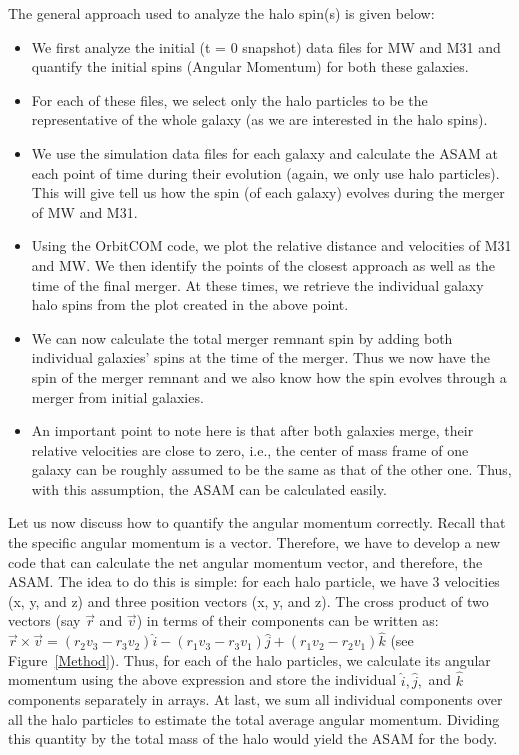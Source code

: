 \documentclass[twocolumn]{aastex631}
\begin{document}
The general approach used to analyze the halo spin(s) is given below:

\begin{itemize}
    \item We first analyze the initial (t = 0 snapshot) data files for MW and M31 and quantify the initial spins (Angular Momentum) for both these galaxies. 

    \item For each of these files, we select only the halo particles to be the representative of the whole galaxy (as we are interested in the halo spins).

    \item We use the simulation data files for each galaxy and calculate the ASAM at each point of time during their evolution (again, we only use halo particles).  This will give tell us how the spin (of each galaxy) evolves during the merger of MW and M31. 

    \item Using the OrbitCOM code, we plot the relative distance and velocities of M31 and MW. We then identify the points of the closest approach as well as the time of the final merger. At these times, we retrieve the individual galaxy halo spins from the plot created in the above point. 

    \item We can now calculate the total merger remnant spin by adding both individual galaxies' spins at the time of the merger. Thus we now have the spin of the merger remnant and we also know how the spin evolves through a merger from initial galaxies. 

    \item An important point to note here is that after both galaxies merge, their relative velocities are close to zero, i.e., the center of mass frame of one galaxy can be roughly assumed to be the same as that of the other one. Thus, with this assumption, the ASAM can be calculated easily.
    
\end{itemize}

 Let us now discuss how to quantify the angular momentum correctly. Recall that the specific angular momentum is a vector. Therefore, we have to develop a new code that can calculate the net angular momentum vector, and therefore, the ASAM. The idea to do this is simple: for each halo particle, we have 3 velocities (x, y, and z) and three position vectors (x, y, and z). The cross product of two vectors (say $\vec{r}$ and $\vec{v}$) in terms of their components can be written as: $\vec{r}\times\vec{v} = (r_{2}v_{3} - r_{3}v_{2})\hat{i} - (r_{1}v_{3} - r_{3}v_{1})\hat{j} + (r_{1}v_{2} - r_{2}v_{1})\hat{k}$ (see Figure~\ref{Method}). Thus, for each of the halo particles, we calculate its angular momentum using the above expression and store the individual $\hat{i}, \hat{j},$ and $\hat{k}$ components separately in arrays. At last, we sum all individual components over all the halo particles to estimate the total average angular momentum. Dividing this quantity by the total mass of the halo would yield the ASAM for the body. 
\end{document}
